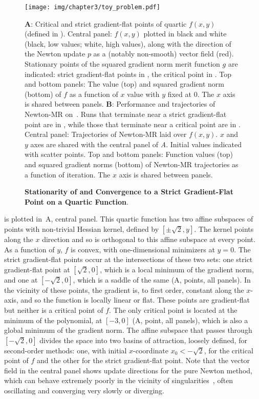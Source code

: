 \documentclass[../../thesis.tex]{subfiles}
\begin{document}
\begin{figure}
	\texttt{[image: img/chapter3/toy\_problem.pdf]}
	\caption{\textbf{Stationarity of and Convergence to
	a Strict Gradient-Flat Point on a Quartic Function}.}%
	{\textbf{A}:
	Critical and strict gradient-flat points
	of quartic $f(x,y)$ (defined in ).
	Central panel:
	$f(x,y)$
	plotted in black and white
	(black, low values; white, high values),
	along with the direction of the Newton update $p$
	as a (notably non-smooth) vector field (red).
	Stationary points of
	the squared gradient norm merit function $g$ are indicated:
	strict gradient-flat points in \failcolor{},
	the critical point in \successcolor{}.
	Top and bottom panels:
	The value (top) and squared gradient norm (bottom)
	of $f$ as a function of $x$ value
	with $y$ fixed at 0.
	The $x$ axis is shared between panels.
	\textbf{B}:
	Performance and trajectories of Newton-MR
	on~.
	Runs that terminate near a strict gradient-flat point
	are in \failcolor{},
	while those that terminate near
	a critical point are in \successcolor{}.
	Central panel:
	Trajectories of Newton-MR laid over
	$f(x, y)$.
	$x$ and $y$ axes are shared with the central panel of
	\emph{A}.
	Initial values indicated with scatter points.
	Top and bottom panels:
	Function values (top) and squared gradient norms (bottom)
	of Newton-MR trajectories as a function of iteration.
	The $x$ axis is shared between panels.}
\end{figure}

 is plotted in~A,
central panel.
This quartic function has two affine subspaces
of points with non-trivial Hessian kernel,
defined by $[\pm\sqrt{2}, y]$.
The kernel points along the $x$ direction and so
is orthogonal to this affine subspace at every point.
As a function of $y$, $f$ is convex,
with one-dimensional minimizers at $y=0$.
The strict gradient-flat points occur at the intersections
of these two sets:
one strict gradient-flat point at $[\sqrt{2}, 0]$,
which is a local minimum of the gradient norm,
and one at $[-\sqrt{2}, 0]$,
which is a saddle of the same
(A, \failcolor{} points, all panels).
In the vicinity of these points, the gradient is,
to first order, constant along the $x$-axis,
and so the function is locally linear or flat.
These points are gradient-flat but
neither is a critical point of $f$.
The only critical point is located at the minimum of the polynomial,
at $[-3, 0]$
(A, \successcolor{} point, all panels),
which is also a global minimum of the gradient norm.
The affine subspace that passes through
$[-\sqrt{2}, 0]$ divides the space into two
basins of attraction, loosely defined,
for second-order methods:
one, with initial $x$-coordinate $x_0<-\sqrt{2}$,
for the critical point of $f$
and the other for the strict gradient-flat point.
Note that the vector field in the central panel shows update directions
for the pure Newton method,
which can behave extremely poorly in the vicinity
of singularities~\cite{powell1970,griewank1983},
often oscillating and converging very slowly
or diverging.
\end{document}
